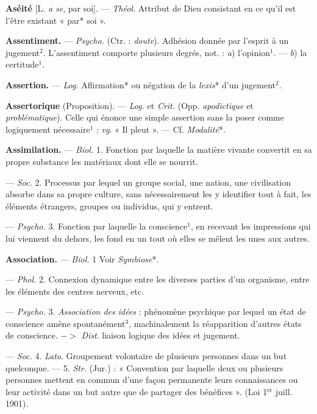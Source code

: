 \begin{itemize}[leftmargin=1cm, label=, itemsep=1pt]
{{{{\item {\bf Aséité} [L. {\it a se}, par soi]. — \textsf{\textit {Théol.}}
Attribut de Dieu consistant en ce
qu'il est l’être existant « par* soi ».

\item {\bf Assentiment.} — \textsf{\textit {Psycho.}} (Ctr. : {\it doute}).
Adhésion donnée par l'esprit à un
jugement$^2$. L’assentiment comporte
plusieurs degrés, not. : {\it a}) l'opinion$^1$.
— {\it b}) la certitude$^1$.

\item {\bf Assertion.} — \textsf{\textit {Log.}} Aflirmation* ou
négation de la {\it lexis}* d'un jugement$^2$.

\item {\bf Assertorique} (Proposition). — \textsf{\textit {Log.}}
et \textsf{\textit {Crit.}} (Opp. {\it apodictique} et {\it problématique}). Celle qui énonce une
simple assertion sans la poser comme
logiquement nécessaire$^1$ : {\it vg}. « Il
pleut ». — Cf. {\it Modalité}*.


\item {\bf Assimilation.} — \textsf{\textit {Biol.}} 1. Fonction
par laquelle la matière vivante convertit en sa propre substance les
matériaux dont elle se nourrit.

— \textsf{\textit {Soc.}} 2. Processus par lequel un
groupe social, une nation, une civilisation absorbe dans sa propre
culture, sans nécessairement les y identifier tout à fait,
les éléments étrangers, groupes ou individus, qui y
entrent.

— \textsf{\textit {Psycho.}} 3. Fonction par laquelle la conscience$^1$, en recevant
les impressions qui lui viennent du
dehors, les fond en un tout où elles
se mêlent les unes aux autres.


\item {\bf Association.} — \textsf{\textit {Biol.}} 1 Voir {\it Symbiose}*.

— \textsf{\textit {Phol.}} 2. Connexion dynamique
entre les diverses parties d’un organisme, entre les éléments des centres
nerveux, etc.

— \textsf{\textit {Psycho.}} 3. {\it Association des
idées} : phénomène psychique par
lequel un état de conscience amène
spontanément$^3$, machinalement la
réapparition d’autres états de conscience. $->$ {\it Dist}. liaison logique
des idées et jugement.

— \textsf{\textit {Soc.}} 4. {\it Lato}. Groupement
volontaire de plusieurs personnes
dans un but quelconque. — 5. {\it Str}.
(Jur.) : « Convention par laquelle
deux ou plusieurs personnes mettent
en commun d’une façon permanente
leurs connaissances ou leur activité
dans un but autre que de partager
des bénéfices ». (Loi 1$^\text{er}$ juill. 1901).

}}}}
\end{itemize}
